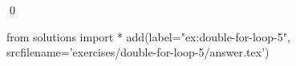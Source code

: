 
    \begin{ex}
  \label{ex:double-for-loop-5}
  
  \qed
\end{ex}
\begin{python0}
from solutions import *
add(label="ex:double-for-loop-5",
    srcfilename='exercises/double-for-loop-5/answer.tex') 
\end{python0}                              
